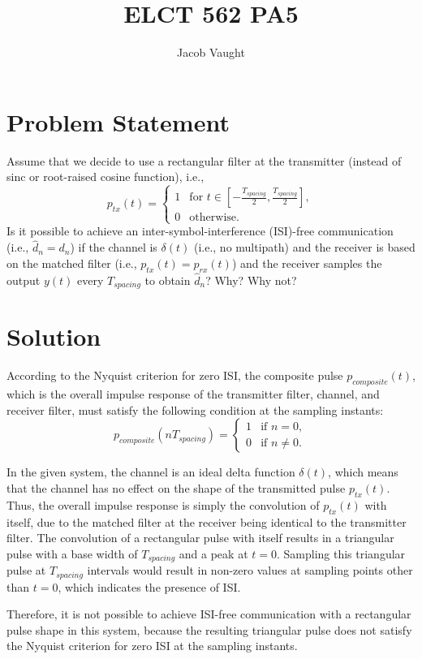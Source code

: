 \documentclass{article}
\title{ELCT 562 PA5}
\author{Jacob Vaught}
\date{}
\begin{document}
\maketitle

\section*{Problem Statement}

Assume that we decide to use a rectangular filter at the transmitter (instead of sinc or root-raised cosine function), i.e., 
\[
p_{tx}(t) = \begin{cases} 
1 & \text{for } t \in \left[-\frac{T_{spacing}}{2}, \frac{T_{spacing}}{2}\right], \\
0 & \text{otherwise}.
\end{cases}
\]
Is it possible to achieve an inter-symbol-interference (ISI)-free communication (i.e., \( \hat{d}_n = d_n \)) if the channel is \( \delta(t) \) (i.e., no multipath) and the receiver is based on the matched filter (i.e., \( p_{tx}(t) = p_{rx}(t) \)) and the receiver samples the output \( y(t) \) every \( T_{spacing} \) to obtain \( \hat{d}_n \)? Why? Why not?

\section*{Solution}

According to the Nyquist criterion for zero ISI, the composite pulse \( p_{composite}(t) \), which is the overall impulse response of the transmitter filter, channel, and receiver filter, must satisfy the following condition at the sampling instants:
\[
p_{composite}(nT_{spacing}) = \begin{cases} 
1 & \text{if } n = 0, \\
0 & \text{if } n \neq 0.
\end{cases}
\]

In the given system, the channel is an ideal delta function \( \delta(t) \), which means that the channel has no effect on the shape of the transmitted pulse \( p_{tx}(t) \). Thus, the overall impulse response is simply the convolution of \( p_{tx}(t) \) with itself, due to the matched filter at the receiver being identical to the transmitter filter. The convolution of a rectangular pulse with itself results in a triangular pulse with a base width of \( T_{spacing} \) and a peak at \( t = 0 \). Sampling this triangular pulse at \( T_{spacing} \) intervals would result in non-zero values at sampling points other than \( t = 0 \), which indicates the presence of ISI.

Therefore, it is not possible to achieve ISI-free communication with a rectangular pulse shape in this system, because the resulting triangular pulse does not satisfy the Nyquist criterion for zero ISI at the sampling instants.
\end{document}
